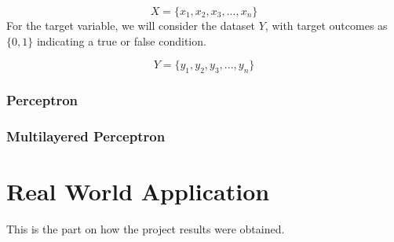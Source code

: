 \documentclass[12pt]{article}
\begin{document}
$$
X = \lbrace x_{1}, x_{2}, x_{3}, ... , x_{n} \rbrace 
$$ 
For the target variable, we will consider the dataset $Y$, with target outcomes as 
$\lbrace0,1\rbrace$ indicating a true or false condition.

$$
Y = \lbrace y_{1}, y_{2}, y_{3}, ... , y_{n} \rbrace 
$$

\newpage
\section{Perceptron}

\newpage
\section{Multilayered Perceptron}

\newpage
\part{Real World Application}
This is the part on how the project results were obtained.\\
\end{document}
